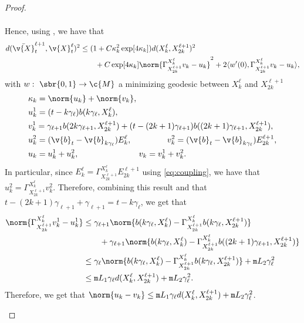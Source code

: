 \begin{proof}{}{}
\begin{enumerate}[wide, labelindent=0pt, label=(\alph*)]
\begin{align}
		      \end{align}
		      Hence, using , we have that \begin{align} \label{eq:upper_bound_distance_cheng} d(\bar{\v{X}}_{t}^{\ell+1}, \v{X}_{t}^\ell)^2 &\leq (1 +C \kappa_k^2 \exp[4 \kappa_k]) d(X_k^\ell,X_{2k}^{\ell+1})^2 \\ & \qquad + C \exp[4 \kappa_k] \norm{\Gamma_{X_{2k}^{\ell+1}}^{X_k^\ell} v_k - u_k}^2 + 2 \langle w'(0), \Gamma_{X_{2k}^{\ell+1}}^{X_k^\ell} v_k - u_k \rangle , \end{align} with \(w: \ \sbr{0,1} \to \c{M}\) a minimizing geodesic between \(X_k^\ell\) and \(X_{2k}^{\ell+1}\) \begin{align}  & \kappa_k = \norm{u_k} + \norm{v_k} , \\ &u_k^1 = (t- k\gamma_\ell) b(k \gamma_\ell, X_k^\ell) , \\ &v_k^1 = \gamma_{\ell+1} b(2k \gamma_{\ell + 1}, X_{2k}^{\ell+1}) + (t - (2k+1) \gamma_{\ell+1}) b((2k+1) \gamma_{\ell + 1}, X_{2k}^{\ell+1}) , \\ &u_k^2 = (\v{b}_{t} - \v{b}_{k \gamma_\ell}) E_{k}^{\ell} , \qquad \quad \quad \ v_k^2 = (\v{b}_{t} - \v{b}_{k \gamma_\ell}) E_{2k}^{\ell+1} , \\ &u_k = u_k^1 + u_k^2 , \qquad \qquad \qquad \quad \ v_k = v_k^1 + v_k^2 .
		      \end{align}
		      In particular, since \(E_k^\ell = \Gamma_{X_{2k}^{\ell+1}}^{X_{k}^\ell} E_{2k}^{\ell+1}\) using \eqref{eq:coupling}, we have that \(u_k^2 = \Gamma_{X_{2k}^{\ell+1}}^{X_{k}^\ell} v_k^2\).
		      Therefore, combining this result and that \(t- (2k+1)\gamma_{\ell+1} + \gamma_{\ell+1} = t - k \gamma_\ell\), we get that \begin{align} \norm{\Gamma_{X_{2k}^{\ell+1}}^{X_{k}^\ell} v_k^1 - u_k^1} & \leq \gamma_{\ell+1} \norm{b(k \gamma_\ell, X_k^\ell) - \Gamma_{X_{2k}^{\ell+1}}^{X_{k}^\ell} b(k \gamma_\ell, X_{2k}^{\ell+1})} \\ & \qquad + \gamma_{\ell+1} \norm{b(k \gamma_\ell, X_k^\ell) - \Gamma_{X_{2k}^{\ell+1}}^{X_{k}^\ell} b((2 k +1) \gamma_{\ell+1}, X_{2k}^{\ell+1})} \\ &\leq \gamma_{\ell} \norm{b(k \gamma_\ell, X_k^\ell) - \Gamma_{X_{2k}^{\ell+1}}^{X_{k}^\ell} b(k \gamma_\ell, X_{2k}^{\ell+1})} + \mathtt{m}{L}_2 \gamma_{\ell}^2 \\ &\leq \mathtt{m}{L}_1 \gamma_\ell d(X_k^\ell, X_{2k}^{\ell+1}) + \mathtt{m}{L}_2 \gamma_\ell^2 .
		      \end{align}
		      Therefore, we get that \(\norm{u_k - v_k} \leq \mathtt{m}{L}_1 \gamma_\ell d(X_k^\ell, X_{2k}^{\ell+1}) + \mathtt{m}{L}_2 \gamma_\ell^2\).

\end{enumerate}
\end{proof}

